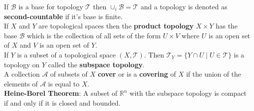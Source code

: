 \documentclass[a4paper]{article}
\begin{document}
\noindent If $\mathcal{B}$ is a base for topology $\mathcal{T}$ then $\cup_{i}\mathcal{B} = \mathcal{T}$ and a topology is denoted as \textbf{second-countable} if it's base is finite.\\

\noindent If $X$ and $Y$ are topological spaces then the \textbf{product topology} $X\times Y$ has the base $\mathcal{B}$ which is the collection of all sets of the form $U\times V$ where $U$ is an open set of $X$ and $V$ is an open set of $Y$.\\

\noindent If $Y$ is a subset of a topological space $(X,\mathcal{T})$. Then $\mathcal{T}_{Y} = \{Y\cap U\mid U\in\mathcal{T}\}$ is a topology on $Y$ called the \textbf{subspace topology}.\\

\noindent A collection $\mathcal{A}$ of subsets of $X$ \textbf{cover} or is a \textbf{covering} of $X$ if the union of the elements of $\mathcal{A}$ is equal to $X$.\\

\noindent \textbf{Heine-Borel Theorem}: A subset of $\mathbb{R}^{n}$ with the subspace topology is compact if and only if it is closed and bounded.\\ 
\end{document}

